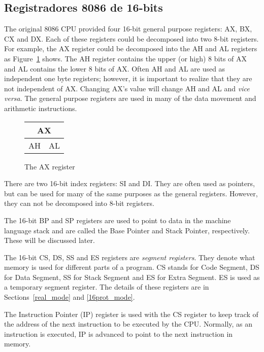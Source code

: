\subsection{Registradores 8086 de 16-bits}

The original 8086 CPU provided four 16-bit general purpose registers:
AX, BX, CX and DX. Each of these registers could be decomposed into
two 8-bit registers. For example, the AX register could be decomposed
into the AH and AL registers as Figure~\ref{fig:AX_reg} shows. The AH
register contains the upper (or high) 8 bits of AX and AL contains the
lower 8 bits of AX. Often AH and AL are used as independent one byte
registers; however, it is important to realize that they are not
independent of AX. Changing AX's value will change AH and AL and
{\em vice versa}\/. The general purpose registers are used in many of
the data movement and arithmetic instructions.

\begin{figure}
\begin{center}
\begin{tabular}{cc}
\multicolumn{2}{c}{AX} \\
\hline
\multicolumn{1}{||c|}{AH} & \multicolumn{1}{c||}{AL} \\
\hline
\end{tabular}
\caption{The AX register \label{fig:AX_reg} }
\end{center}
\end{figure}

There are two 16-bit index registers: SI and
DI. They are often used as pointers, but can be used for many of the
same purposes as the general registers. However, they can not be
decomposed into 8-bit registers.

The 16-bit BP and SP registers are used to point to data in the
machine language stack and are called the Base Pointer
and Stack Pointer, respectively. These will be discussed later.

The 16-bit CS, DS, SS and ES registers are \emph{segment
registers}.  They denote what memory is used
for different parts of a program. CS stands for Code Segment, DS for
Data Segment, SS for Stack Segment and ES for Extra Segment. ES is
used as a temporary segment register. The details of these registers
are in Sections~\ref{real_mode} and \ref{16prot_mode}.

The Instruction Pointer (IP)  register is used with
the CS register to keep track of the address of the next instruction
to be executed by the CPU. Normally, as an instruction is executed, IP
is advanced to point to the next instruction in memory.

